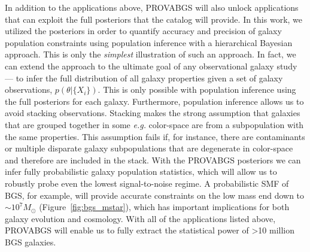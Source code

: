 In addition to the applications above, {\sc PROVABGS} will also unlock
applications that can exploit the full posteriors that the catalog will
provide. 
In this work, we utilized the posteriors in order to quantify accuracy and
precision of galaxy population constraints using population inference with a
hierarchical Bayesian approach. 
This is only the \emph{simplest} illustration of such an approach. 
In fact, we can extend the approach to the ultimate goal of any observational
galaxy study --- to infer the full distribution of all galaxy properties given
a set of galaxy observations, $p(\theta | \{X_i\})$.
This is only possible with population inference using the full posteriors for
each galaxy.
Furthermore, population inference allows us to avoid stacking observations. 
Stacking makes the strong assumption that galaxies that are grouped together in
some \emph{e.g.} color-space are from a subpopulation with the same properties. 
This assumption fails if, for instance, there are contaminants or multiple
disparate galaxy subpopulations that are degenerate in color-space and
therefore are included in the stack. 
With the {\sc PROVABGS} posteriors we can infer fully probabilistic galaxy
population statistics, which will allow us to robustly probe even the lowest
signal-to-noise regime.
A probabilistic SMF of BGS, for example, will provide accurate constraints on
the low mass end down to ${\sim}10^{7} M_\odot$ (Figure~\ref{fig:bgs_mstar}),
which has important implications for both galaxy evolution and cosmology. 
With all of the applications listed above, {\sc PROVABGS} will enable us to
fully extract the statistical power of >10 million BGS galaxies.
